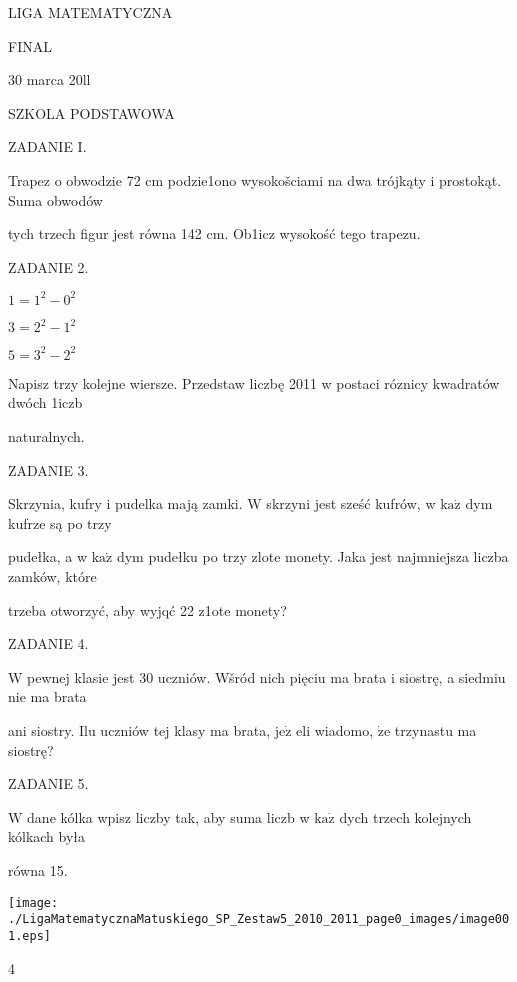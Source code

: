 \documentclass[a4paper,12pt]{article}
\begin{document}
LIGA MATEMATYCZNA

FINAL

30 marca 20ll

SZKOLA PODSTAWOWA

ZADANIE I.

Trapez o obwodzie 72 cm podzie1ono wysokošciami na dwa trójkąty i prostokąt. Suma obwodów

tych trzech figur jest równa 142 cm. Ob1icz wysokość tego trapezu.

ZADANIE 2.

$1=1^{2}-0^{2}$

$3=2^{2}-1^{2}$

$5=3^{2}-2^{2}$

Napisz trzy kolejne wiersze. Przedstaw liczbę 2011 w postaci róznicy kwadratów dwóch 1iczb

naturalnych.

ZADANIE 3.

Skrzynia, kufry i pudelka mają zamki. $\mathrm{W}$ skrzyni jest sześć kufrów, w $\mathrm{k}\mathrm{a}\dot{\mathrm{z}}$ dym kufrze są po trzy

pudełka, a w $\mathrm{k}\mathrm{a}\dot{\mathrm{z}}$ dym pudełku po trzy zlote monety. Jaka jest najmniejsza liczba zamków, które

trzeba otworzyć, aby wyjqć 22 z1ote monety?

ZADANIE 4.

$\mathrm{W}$ pewnej klasie jest 30 uczniów. Wšród nich pięciu ma brata i siostrę, a siedmiu nie ma brata

ani siostry. Ilu uczniów tej klasy ma brata, $\mathrm{j}\mathrm{e}\dot{\mathrm{z}}$ eli wiadomo, $\dot{\mathrm{z}}\mathrm{e}$ trzynastu ma siostrę?

ZADANIE 5.

$\mathrm{W}$ dane kólka wpisz liczby tak, aby suma liczb w $\mathrm{k}\mathrm{a}\dot{\mathrm{z}}$ dych trzech kolejnych kólkach była

równa 15.
\begin{center}
\texttt{[image: ./LigaMatematycznaMatuskiego\_SP\_Zestaw5\_2010\_2011\_page0\_images/image001.eps]}
\end{center}
4
\end{document}
